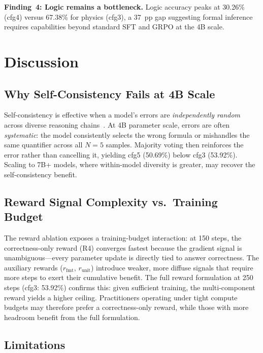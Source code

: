 \documentclass{ieeeaccess}
\begin{document}
\textbf{Finding~4: Logic remains a bottleneck.}
Logic accuracy peaks at 30.26\% (cfg4) versus 67.38\% for physics (cfg3),
a 37~pp gap suggesting formal inference requires capabilities beyond
standard SFT and GRPO at the 4B scale.

\section{Discussion}
\label{sec:discussion}

\subsection{Why Self-Consistency Fails at 4B Scale}

Self-consistency is effective when a model's errors are
\emph{independently random} across diverse reasoning
chains~\cite{Wang2023sc}.
At 4B parameter scale, errors are often \emph{systematic}: the model
consistently selects the wrong formula or mishandles the same quantifier
across all $N{=}5$ samples.
Majority voting then reinforces the error rather than cancelling it,
yielding cfg5 (50.69\%) below cfg3 (53.92\%).
Scaling to 7B+ models, where within-model diversity is greater,
may recover the self-consistency benefit.

\subsection{Reward Signal Complexity vs.\ Training Budget}

The reward ablation exposes a training-budget interaction:
at 150 steps, the correctness-only reward (R4) converges fastest
because the gradient signal is unambiguous---every parameter update
is directly tied to answer correctness.
The auxiliary rewards ($r_\text{fmt}$, $r_\text{unit}$) introduce
weaker, more diffuse signals that require more steps to exert their
cumulative benefit.
The full reward formulation at 250 steps (cfg3: 53.92\%) confirms this:
given sufficient training, the multi-component reward yields
a higher ceiling.
Practitioners operating under tight compute budgets may therefore
prefer a correctness-only reward, while those with more headroom
benefit from the full formulation.

\subsection{Limitations}
\end{document}
